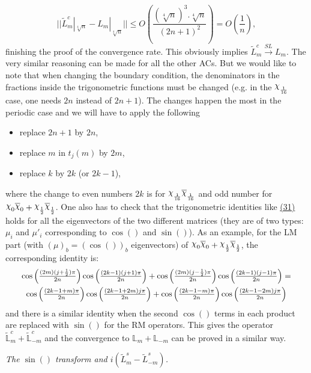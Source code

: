 \documentclass[twoside,11pt,titlepage]{amsart}
\renewcommand{\=}[1]{\stackrel{#1}{=}} %
\theoremstyle{definition}
\theoremstyle{remark}
\DeclareRobustCommand{\rchi}{{\mathpalette\irchi\relax}}
\newcommand{\irchi}[2]{\raisebox{\depth}{$#1\chi$}}
\begin{document}
$$||\widetilde{L}_{m}^c|_{\sqrt[4]{n}}-L_{m}|_{\sqrt[4]{n}}|| \le O(\frac{(\sqrt[4]{n})^3.\sqrt[4]{n}}{(2n+1)^2})=O(\frac{1}{n}),$$
finishing the proof of the convergence rate. This obviously implies $\widetilde{L}_m^c \xrightarrow{SL} L_m$. The very similar reasoning can be made for all the other ACs. But we would like to note that when changing the boundary condition, the denominators in the fractions inside the trigonometric functions must be changed (e.g. in the $\rchi_\frac{1}{16}$ case, one needs $2n$ instead of $2n+1$). The changes happen the most in the periodic case and we  will have to apply the following
\begin{itemize}
    \item replace $2n+1$ by $2n$,
    \item replace $m$ in $t_j(m)$ by $2m$,
    \item replace $k$ by $2k$ (or $2k-1$),
\end{itemize}

where the change to even numbers $2k$ is for $\rchi_{\frac{1}{16}}\overline{\rchi}_{\frac{1}{16}}$ and odd number for $\rchi_0\overline{\rchi}_0+\rchi_{\frac{1}{2}}\overline{\rchi}_{\frac{1}{2}}$. One also has to check that the trigonometric identities like \hyperref[eq31]{(31)} holds for all the eigenvectors of the two different matrices (they are of two types: $\mu_i$ and $\mu'_i$ corresponding to $\cos()$ and $\sin()$). As an example, for the LM part (with $(\mu)_b=(\cos())_b$ eigenvectors) of $\rchi_0\overline{\rchi}_0+\rchi_{\frac{1}{2}}\overline{\rchi}_{\frac{1}{2}}$, the corresponding identity is:
\begin{gather*}
\scalebox{0.97}{$\cos\Big(\frac{(2m)(j+\frac{1}{2})\pi}{2n}\Big)\cos \Big(\frac{(2k-1)(j+1)\pi}{2n}\Big)+\cos\Big(\frac{(2m)(j-\frac{1}{2})\pi}{2n}\Big)\cos \Big(\frac{(2k-1)(j-1)\pi}{2n} \Big)= $}\\
\scalebox{0.97}{$\cos \Big(\frac{(2k-1+m)\pi}{2n}\Big)\cos \Big(\frac{(2k-1+2m)j\pi}{2n} \Big)+\cos \Big(\frac{(2k-1-m)\pi}{2n}\Big)\cos \Big(\frac{(2k-1-2m)j\pi}{2n} \Big)$}
\end{gather*}
and there is a similar identity when the second $\cos()$ terms in each product are replaced with $\sin()$ for the RM operators. This gives the operator $\widetilde{\mathbb{L}}_m^c+\widetilde{\mathbb{L}}_{-m}^c$ and the convergence to $\mathbb{L}_m+\mathbb{L}_{-m}$ can be proved in a similar way. 
\hfill \break

\textit{The $\sin()$ transform and $i(\widetilde{L}_m^s-\widetilde{L}_{-m}^s)$.}
\end{document}
